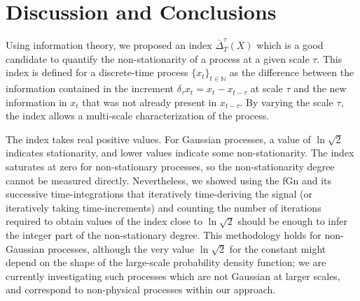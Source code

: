 \documentclass[aps,pra,groupedaddress,notitlepage]{revtex4-1}
\begin{document}
\section{Discussion and Conclusions}
\label{sec:conclusion}


Using information theory, we proposed an index $\bar{\Delta}_T^{\tau}(X)$ which is a good candidate to quantify the non-stationarity of a process at a given scale $\tau$.
This index is defined for a discrete-time process $\{x_t\}_{t\in {\mathbb N}}$ as the difference between the information contained in the increment $\delta_{\tau}x_t=x_t-x_{t-\tau}$ at scale $\tau$ and the new information in $x_t$ that was not already present in $x_{t-\tau}$.
By varying the scale $\tau$, the index allows a multi-scale characterization of the process.

The index takes real positive values. {For Gaussian processes,} a value of $\ln\sqrt{2}$ indicates stationarity, and lower values indicate some non-stationarity. The index saturates at zero for non-stationary processes, so the non-stationarity degree cannot be measured directly. Nevertheless, we showed using the fGn and its successive time-integrations that iteratively time-deriving  the signal (or iteratively taking time-increments) and counting the number of iterations required to obtain values of the index close to $\ln\sqrt{2}$ should be enough to infer the integer part of the non-stationary degree.
{This methodology holds for non-Gaussian processes, although the very value $\ln\sqrt{2}$ for the constant might depend on the shape of the large-scale probability density function; we are currently investigating such processes which are not Gaussian at larger scales, and correspond to non-physical processes within our approach.}
\end{document}
